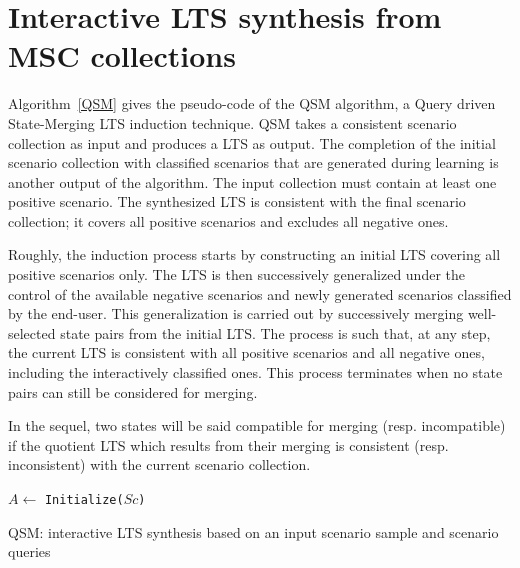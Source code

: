 \section{Interactive LTS synthesis from MSC collections\label{section:lts-induction-from-mscs}}

Algorithm~\ref{QSM} gives the pseudo-code of the \textsc{QSM} algorithm, a Query driven State-Merging LTS induction technique. \textsc{QSM} takes a consistent scenario collection as input and produces a LTS as output. The completion of the initial scenario collection with classified scenarios that are generated during learning is another output of the algorithm. The input collection must contain at least one positive scenario. The synthesized LTS is consistent with the final scenario collection; it covers all  positive scenarios and excludes all negative ones.

Roughly, the induction process starts by constructing an initial LTS covering all positive scenarios only. The LTS is then successively generalized under the control of the available negative scenarios and newly generated scenarios classified by the end-user. This generalization is carried out by successively merging well-selected state pairs from the initial LTS. The process is such that, at any step, the current LTS is consistent with all positive scenarios and all negative ones, including the interactively classified ones. This process terminates when no state pairs can still be considered for merging.

In the sequel, two states will be said compatible for merging (resp. incompatible) if the quotient LTS which results from their merging is consistent (resp. inconsistent) with the current scenario collection.

\begin{algorithm}
{
$A \leftarrow $ {\tt Initialize($Sc$)}\\
}
\vspace{0.2cm}
\caption{\textsc{QSM}: interactive LTS synthesis based on an input scenario sample and scenario queries\label{QSM}}
\end{algorithm}

